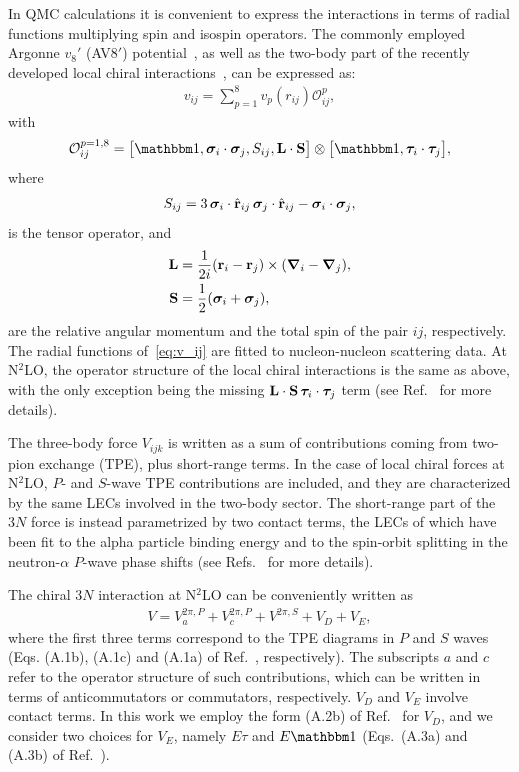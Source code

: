 \documentclass[aps,prc,twocolumn,superscriptaddress,floatfix]{revtex4-1}
\begin{document}
In QMC calculations it is convenient to express the interactions
in terms of radial functions multiplying spin and isospin operators. The commonly 
employed Argonne $v_8'$ (AV8$'$) potential~\cite{Wiringa:2002}, as well as the two-body
part of the recently developed local chiral interactions~\cite{Gezerlis:2013}, 
can be expressed as:
\begin{align}
	v_{ij} = \sum_{p=1}^8 v_p(r_{ij}) \mathcal O_{ij}^{p},
	\label{eq:v_ij}
\end{align}
with
\begin{align}
	\mathcal O_{ij}^{p=1,8} = \big[\mathbbm 1,\bm\sigma_i\cdot\bm\sigma_j,S_{ij},\vb{L}\cdot\vb{S}\big]
	\otimes\big[\mathbbm 1,\bm\tau_i\cdot\bm\tau_j\big],
\end{align}
where
\begin{align}
	S_{ij}=3\,\bm\sigma_i\cdot\hat{\vb{r}}_{ij}\,\bm\sigma_j\cdot\hat{\vb{r}}_{ij}-\bm\sigma_i\cdot\bm\sigma_j,
\end{align}
is the tensor operator, and
\begin{align}
	\vb{L}&=\frac{1}{2i}(\vb{r}_i-\vb{r}_j)\times(\bm\nabla_i-\bm\nabla_j), \label{eq:L} \\
	\vb{S}&=\frac{1}{2}(\bm\sigma_i+\bm\sigma_j), \label{eq:S}
\end{align}
are the relative angular momentum and the total spin of the pair $ij$, respectively.
The radial functions of~\cref{eq:v_ij} are fitted to nucleon-nucleon scattering data.
At N$^2$LO, the operator structure of the local chiral interactions is the same as 
above, with the only exception being the missing $\vb{L}\cdot\vb{S}\,\bm\tau_i\cdot\bm\tau_j$ term
(see Ref.~\cite{Gezerlis:2014} for more details).

The three-body force $V_{ijk}$ is written as a sum of contributions coming from two-pion
exchange (TPE), plus short-range terms. In the case of local chiral forces at N$^2$LO, $P$- and $S$-wave
TPE contributions are included, and they are characterized by the same LECs involved in the two-body sector. 
The short-range part of the $3N$ force is instead parametrized by two contact terms, 
the LECs of which have been fit to the alpha particle binding energy and to the spin-orbit splitting in 
the neutron-$\alpha$ $P$-wave phase shifts (see Refs.~\cite{Lynn:2016,Lynn:2017} for more details).

The chiral $3N$ interaction at N$^2$LO can be conveniently written as
\begin{align}
V=V_a^{2\pi,P}+V_c^{2\pi,P}+V^{2\pi,S}+V_D+V_E,
\label{eq:v_ijk}
\end{align}
where the first three terms correspond to the TPE diagrams in $P$ and $S$ waves (Eqs. (A.1b),
(A.1c) and (A.1a) of Ref.~\cite{Lynn:2017}, respectively). The subscripts $a$ and $c$ refer 
to the operator structure of such contributions, which can be written in terms of anticommutators 
or commutators, respectively. $V_D$ and $V_E$ involve contact terms. In this work we employ
the form (A.2b) of Ref.~\cite{Lynn:2017} for $V_D$, and we consider two choices for $V_E$, 
namely $E\tau$ and $E\mathbbm1$ (Eqs.~(A.3a) and (A.3b) of Ref.~\cite{Lynn:2017}).
\end{document}
